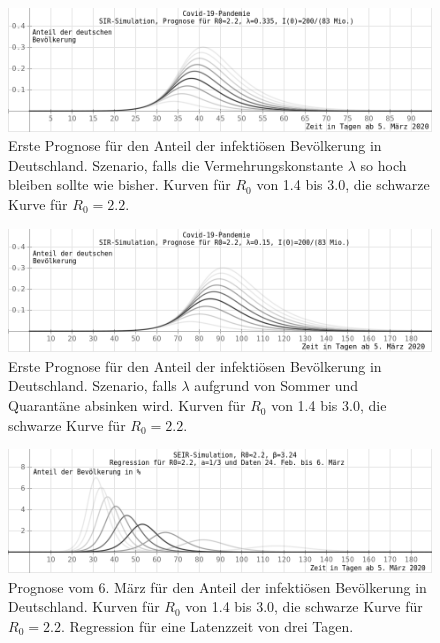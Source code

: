 \documentclass[a4paper,11pt,fleqn,twocolumn,twoside,dvipdfmx]{scrartcl}
\numberwithin{equation}{section}
\begin{document}
\begin{figure}[h]
\includegraphics[width=16cm]{img/Covid-19-Simulation1.png}
\caption{Erste Prognose für den Anteil der infektiösen Bevölkerung
in Deutschland.\newline
Szenario, falls die Vermehrungskonstante $\lambda$ so hoch bleiben
sollte wie bisher.\newline
Kurven für $R_0$ von 1.4 bis 3.0, die schwarze Kurve für $R_0=2.2$.}
\end{figure}
\begin{figure}[h]
\includegraphics[width=16cm]{img/Covid-19-Simulation2.png}
\caption{Erste Prognose für den Anteil der infektiösen Bevölkerung
in Deutschland.\newline
Szenario, falls $\lambda$ aufgrund von Sommer und Quarantäne
absinken wird.\newline
Kurven für $R_0$ von 1.4 bis 3.0, die schwarze Kurve für $R_0=2.2$.}
\vspace{-6em}
\end{figure}

\clearpage
\begin{figure}[h]
\includegraphics[width=16cm]{img/Covid-19-Simulation3.png}
\caption{Prognose vom 6. März für den Anteil der infektiösen Bevölkerung
in Deutschland.\newline
Kurven für $R_0$ von 1.4 bis 3.0, die schwarze Kurve für $R_0=2.2$.\newline
Regression für eine Latenzzeit von drei Tagen.}
\vspace{-6em}
\end{figure}
\end{document}
